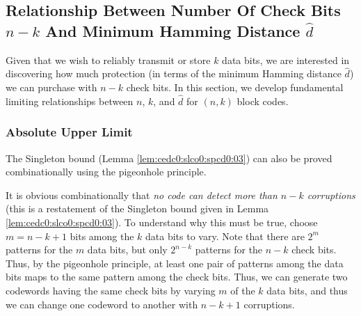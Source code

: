 \subsection[Relationship Between Number Of Check Bits 
            \protect\mbox{\protect$n-k$} 
            And Minimum Hamming 
            Distance \protect\mbox{\protect$\hat{d}$}]
           {Relationship Between Number Of Check Bits 
            \protect\mbox{\protect\boldmath$n-k$} 
            And Minimum Hamming 
            Distance \protect\mbox{\protect\boldmath$\hat{d}$}}
\label{cedc0:scob0:rbc0}

Given that we wish to reliably transmit or store $k$ data bits, 
we are interested in discovering how much protection (in terms of the
minimum Hamming distance $\hat{d}$) we can purchase with $n-k$ check bits.  
In this section,
we develop 
fundamental limiting 
relationships between $n$, $k$, and $\hat{d}$ for $(n,k)$ block codes.


\subsubsection{Absolute Upper Limit}
\label{cedc0:scob0:rbc0:saul0}

The Singleton bound (Lemma \ref{lem:cedc0:slco0:spcd0:03})
can also be proved combinationally using the
pigeonhole principle.

It is obvious combinationally that \emph{no code can detect more than
$n-k$ corruptions} (this is a restatement of the Singleton bound given in
Lemma \ref{lem:cedc0:slco0:spcd0:03}).  To understand why this must be true,
choose $m = n-k+1$ bits among the $k$ data bits to vary.  Note that there
are $2^m$ patterns for the $m$ data bits, but only $2^{n-k}$ patterns for the 
$n-k$ check bits.  Thus, by the pigeonhole principle, at least one pair of patterns among the
data bits maps to the same pattern among the check bits.  Thus, we can generate two
codewords having the same check bits by varying $m$ of the $k$ data bits, and thus we can
change one codeword to another with $n-k+1$ corruptions.


